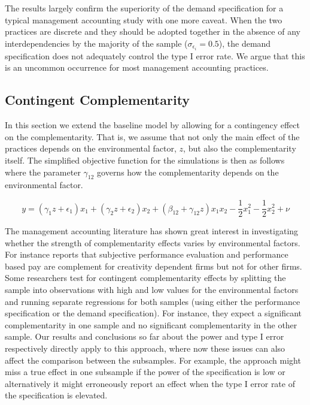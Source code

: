 \documentclass[12pt]{article}
\begin{document}
The results largely confirm the superiority of the demand specification for a typical management accounting study with one more caveat. When the two practices are discrete and they should be adopted together in the absence of any interdependencies by the majority of the sample ($\sigma_{\epsilon_i} = 0.5$), the demand specification does not adequately control the type I error rate. We argue that this is an uncommon occurrence for most management accounting practices.



\subsection{Contingent Complementarity}\label{contingent-complementarity}

In this section we extend the baseline model by allowing for a contingency effect on the complementarity. That is, we assume that not only the main effect of the practices depends on the environmental factor, $z$, but also the complementarity itself. The simplified objective function for the simulations is then as follows where the parameter $\gamma_{12}$ governs how the complementarity depends on the environmental factor. 

\begin{equation}
\label{eq:contingent-complement}
y = (\gamma_1 z + \epsilon_1) x_1 + (\gamma_2 z + \epsilon_2) x_2 + 
    (\beta_{12} + \gamma_{12} z) x_1 x_2 - \frac{1}{2} x^2_1 - \frac{1}{2} x^2_2 + \nu
\end{equation}

The management accounting literature has shown great interest in investigating whether the strength of complementarity effects varies by environmental factors. For instance \citet{grabner_incentive_2014} reports that subjective performance evaluation and performance based pay are complement for creativity dependent firms but not for other firms. Some researchers test for contingent complementarity effects by splitting the sample into observations with high and low values for the environmental factors and running separate regressions for both samples (using either the performance specification or the demand specification). For instance, they expect a significant complementarity in one sample and no significant complementarity in the other sample. Our results and conclusions so far about the power and type I error respectively directly apply to this approach, where now these issues can also affect the comparison between the subsamples. For example, the approach might miss a true effect in one subsample if the power of the specification is low or alternatively it might erroneously report an effect when the type I error rate of the specification is elevated. 
\end{document}
